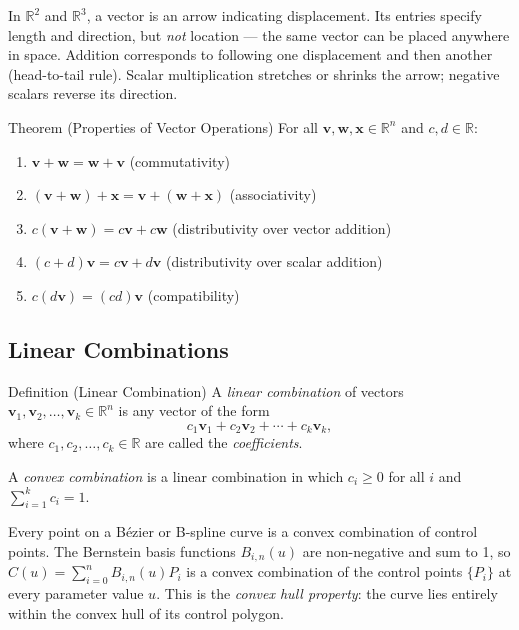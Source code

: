 \begin{remark*}
In $\mathbb{R}^2$ and $\mathbb{R}^3$, a vector is an arrow indicating displacement.
Its entries specify length and direction, but \emph{not} location —
the same vector can be placed anywhere in space.
Addition corresponds to following one displacement and then another (head-to-tail rule).
Scalar multiplication stretches or shrinks the arrow; negative scalars reverse its direction.
\end{remark*}

\begin{theorembox}{Theorem (Properties of Vector Operations)}
For all $\mathbf{v}, \mathbf{w}, \mathbf{x} \in \mathbb{R}^n$ and $c, d \in \mathbb{R}$:
\begin{enumerate}
  \item $\mathbf{v} + \mathbf{w} = \mathbf{w} + \mathbf{v}$ \hfill (commutativity)
  \item $(\mathbf{v} + \mathbf{w}) + \mathbf{x} = \mathbf{v} + (\mathbf{w} + \mathbf{x})$ \hfill (associativity)
  \item $c(\mathbf{v} + \mathbf{w}) = c\mathbf{v} + c\mathbf{w}$ \hfill (distributivity over vector addition)
  \item $(c + d)\mathbf{v} = c\mathbf{v} + d\mathbf{v}$ \hfill (distributivity over scalar addition)
  \item $c(d\mathbf{v}) = (cd)\mathbf{v}$ \hfill (compatibility)
\end{enumerate}
\end{theorembox}

\subsection*{Linear Combinations}

\begin{propositionbox}{Definition (Linear Combination)}
A \emph{linear combination} of vectors $\mathbf{v}_1, \mathbf{v}_2, \ldots, \mathbf{v}_k \in \mathbb{R}^n$
is any vector of the form
\[
  c_1\mathbf{v}_1 + c_2\mathbf{v}_2 + \cdots + c_k\mathbf{v}_k,
\]
where $c_1, c_2, \ldots, c_k \in \mathbb{R}$ are called the \emph{coefficients}.

A \emph{convex combination} is a linear combination in which $c_i \geq 0$
for all $i$ and $\sum_{i=1}^k c_i = 1$.
\end{propositionbox}

\begin{remark*}
Every point on a Bézier or B-spline curve is a convex combination of control points.
The Bernstein basis functions $B_{i,n}(u)$ are non-negative and sum to 1,
so $C(u) = \sum_{i=0}^n B_{i,n}(u) P_i$ is a convex combination of the control
points $\{P_i\}$ at every parameter value $u$.
This is the \emph{convex hull property}: the curve lies entirely within the convex hull
of its control polygon.
\end{remark*}

